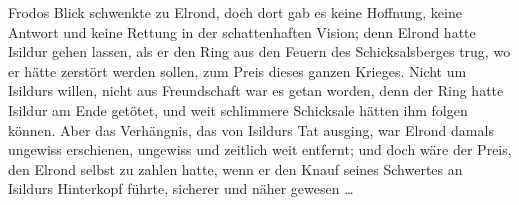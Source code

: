 Frodos Blick schwenkte zu Elrond, doch dort gab es keine Hoffnung, keine Antwort und keine Rettung in der schattenhaften Vision; denn Elrond hatte Isildur gehen lassen, als er den Ring aus den Feuern des Schicksalsberges trug, wo er hätte zerstört werden sollen, zum Preis dieses ganzen Krieges. Nicht um Isildurs willen, nicht aus Freundschaft war es getan worden, denn der Ring hatte Isildur am Ende getötet, und weit schlimmere Schicksale hätten ihm folgen können. Aber das Verhängnis, das von Isildurs Tat ausging, war Elrond damals ungewiss erschienen, ungewiss und zeitlich weit entfernt; und doch wäre der Preis, den Elrond selbst zu zahlen hatte, wenn er den Knauf seines Schwertes an Isildurs Hinterkopf führte, sicherer und näher gewesen …

